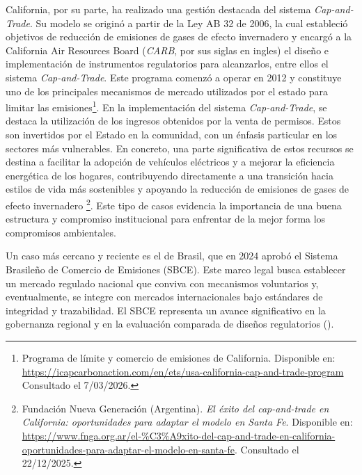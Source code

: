 California, por su parte, ha realizado una gestión destacada del sistema \emph{Cap-and-Trade}. Su modelo se originó a partir de la Ley AB 32 de 2006, la cual estableció objetivos de reducción de emisiones de gases de efecto invernadero y encargó a la California Air Resources Board (\textit{CARB}, por sus siglas en ingles) el diseño e implementación de instrumentos regulatorios para alcanzarlos, entre ellos el sistema \emph{Cap-and-Trade}. Este programa comenzó a operar en 2012 y constituye uno de los principales mecanismos de mercado utilizados por el estado para limitar las emisiones\footnote{Programa de límite y comercio de emisiones de California. Disponible en: \url{https://icapcarbonaction.com/en/ets/usa-california-cap-and-trade-program} Consultado el 7/03/2026.}. En la implementación del sistema \emph{Cap-and-Trade}, se destaca la utilización de los ingresos obtenidos por la venta de permisos. Estos son invertidos por el Estado en la comunidad, con un énfasis particular en los sectores más vulnerables. En concreto, una parte significativa de estos recursos se destina a facilitar la adopción de vehículos eléctricos y a mejorar la eficiencia energética de los hogares, contribuyendo directamente a una transición hacia estilos de vida más sostenibles y apoyando la reducción de emisiones de gases de efecto invernadero \footnote{Fundación Nueva Generación (Argentina). \emph{El éxito del cap-and-trade en California: oportunidades para adaptar el modelo en Santa Fe}. Disponible en: \url{https://www.fnga.org.ar/el-\%C3\%A9xito-del-cap-and-trade-en-california-oportunidades-para-adaptar-el-modelo-en-santa-fe}. Consultado el 22/12/2025.}. Este tipo de casos evidencia la importancia de una buena estructura y compromiso institucional para enfrentar de la mejor forma los compromisos ambientales. \medskip

Un caso más cercano y reciente es el de Brasil, que en 2024 aprobó el Sistema Brasileño de Comercio de Emisiones (SBCE). Este marco legal busca establecer un mercado regulado nacional que conviva con mecanismos voluntarios y, eventualmente, se integre con mercados internacionales bajo estándares de integridad y trazabilidad. El SBCE representa un avance significativo en la gobernanza regional y en la evaluación comparada de diseños regulatorios ().\medskip

